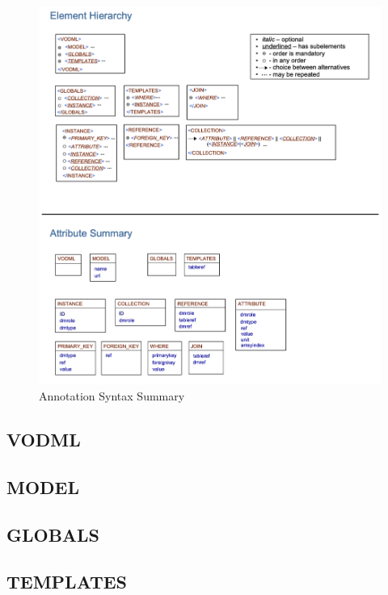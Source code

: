 \documentclass[11pt,a4paper]{ivoa}
\begin{document}
  \begin{figure}[h]
    \begin{center}
      \includegraphics[width=\textwidth]{merged-syntax-summary.png}
      \caption{Annotation Syntax Summary}
      \label{fig:summary}
    \end{center}
  \end{figure}

\pagebreak
\subsection{VODML}

\FloatBarrier
 
\subsection{MODEL}

\FloatBarrier

\subsection{GLOBALS}

\FloatBarrier

\subsection{TEMPLATES}

\FloatBarrier
\end{document}
